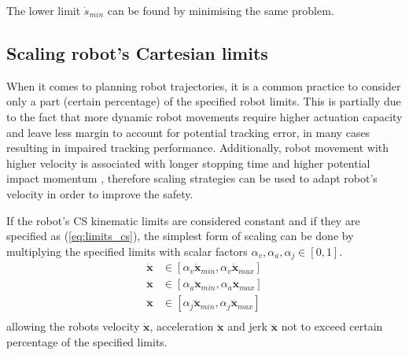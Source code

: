 The lower limit $\dot{s}_{min}$ can be found by minimising the same problem.


\subsection{Scaling robot's Cartesian limits}
When it comes to planning robot trajectories, it is a common practice to consider only a part (certain percentage) of the specified robot limits. This is partially due to the fact that more dynamic robot movements require higher actuation capacity and leave less margin to account for potential tracking error, in many cases resulting in impaired tracking performance. Additionally, robot movement with higher velocity is associated with longer stopping time and higher potential impact momentum \cite{smu}, therefore scaling strategies can be used to adapt robot's velocity in order to improve the safety. 

If the robot's CS kinematic limits are considered constant and if they are specified as (\ref{eq:limits_cs}), the simplest form of scaling can be done by multiplying the specified limits with scalar factors $\alpha_v,\alpha_a,\alpha_j\in[0,1]$.
\begin{equation}
\begin{split}
\dot{\bm{x}}&\in  [\alpha_v\dot{\bm{x}}_{min},\alpha_v\dot{\bm{x}}_{max}] \\
\ddot{\bm{x}}&\in  [\alpha_a\ddot{\bm{x}}_{min},\alpha_a\ddot{\bm{x}}_{max}] \\
\dddot{\bm{x}}&\in  [\alpha_j\dddot{\bm{x}}_{min},\alpha_j\dddot{\bm{x}}_{max}] \\
 \end{split} \label{eq:limits_cs_alpha}
\end{equation}
allowing the robots velocity $\dot{\bm{x}}$, acceleration $\ddot{\bm{x}}$ and jerk $\dddot{\bm{x}}$ not to exceed certain percentage of the specified limits. 

